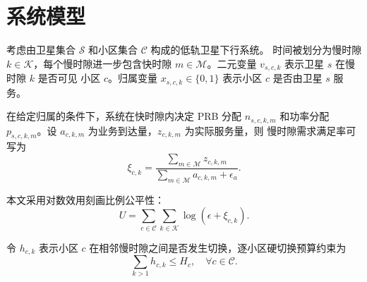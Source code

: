 
\section{系统模型}

考虑由卫星集合 $\mathcal{S}$ 和小区集合 $\mathcal{C}$ 构成的低轨卫星下行系统。
时间被划分为慢时隙 $k\in\mathcal{K}$，每个慢时隙进一步包含快时隙
$m\in\mathcal{M}$。二元变量 $v_{s,c,k}$ 表示卫星 $s$ 在慢时隙 $k$ 是否可见
小区 $c$。归属变量 $x_{s,c,k}\in\{0,1\}$ 表示小区 $c$ 是否由卫星 $s$ 服务。

在给定归属的条件下，系统在快时隙内决定 PRB 分配 $n_{s,c,k,m}$ 和功率分配
$p_{s,c,k,m}$。设 $a_{c,k,m}$ 为业务到达量，$z_{c,k,m}$ 为实际服务量，则
慢时隙需求满足率可写为
\begin{equation}
    \xi_{c,k}
    =
    \frac{\sum_{m\in\mathcal{M}} z_{c,k,m}}
    {\sum_{m\in\mathcal{M}} a_{c,k,m} + \epsilon_a}.
\end{equation}

本文采用对数效用刻画比例公平性：
\begin{equation}
    U = \sum_{c\in\mathcal{C}}\sum_{k\in\mathcal{K}}
    \log(\epsilon+\xi_{c,k}).
\end{equation}

令 $h_{c,k}$ 表示小区 $c$ 在相邻慢时隙之间是否发生切换，逐小区硬切换预算约束为
\begin{equation}
    \sum_{k>1} h_{c,k} \leq H_c,\quad \forall c\in\mathcal{C}.
\end{equation}
